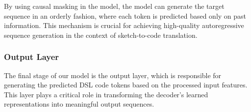 By using causal masking in the model, the model can generate the target sequence in an orderly fashion, where each token is predicted based only on past information. This mechanism is crucial for achieving high-quality autoregressive sequence generation in the context of sketch-to-code translation.



\subsubsection{Output Layer}
The final stage of our model is the output layer, which is responsible for generating the predicted DSL code tokens based on the processed input features. This layer plays a critical role in transforming the decoder's learned representations into meaningful output sequences.


